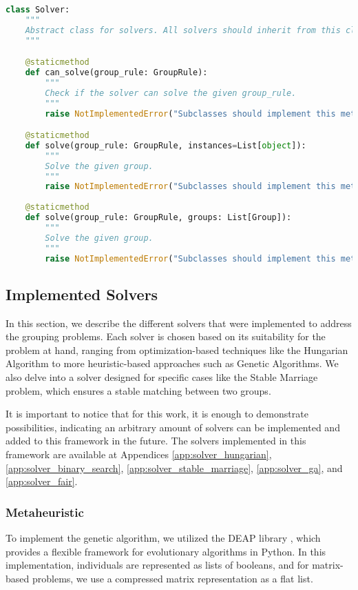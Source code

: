 \begin{lstlisting}[language=Python, caption={Solver Class.}, label={script:solver}]
class Solver:
    """
    Abstract class for solvers. All solvers should inherit from this class.
    """

    @staticmethod
    def can_solve(group_rule: GroupRule):
        """
        Check if the solver can solve the given group_rule.
        """
        raise NotImplementedError("Subclasses should implement this method.")

    @staticmethod
    def solve(group_rule: GroupRule, instances=List[object]):
        """
        Solve the given group.
        """
        raise NotImplementedError("Subclasses should implement this method.")
    
    @staticmethod
    def solve(group_rule: GroupRule, groups: List[Group]):
        """
        Solve the given group.
        """
        raise NotImplementedError("Subclasses should implement this method.")
    \end{lstlisting}

    \subsection{Implemented Solvers}
    \label{sec:implemented_solvers}
    In this section, we describe the different solvers that were implemented to address the grouping problems. Each solver is chosen based on its suitability for the problem at hand, ranging from optimization-based techniques like the Hungarian Algorithm to more heuristic-based approaches such as Genetic Algorithms. We also delve into a solver designed for specific cases like the Stable Marriage problem, which ensures a stable matching between two groups.

    It is important to notice that for this work, it is enough to demonstrate possibilities, indicating an arbitrary amount of solvers can be implemented and added to this framework in the future.
    The solvers implemented in this framework are available at Appendices \ref{app:solver_hungarian}, \ref{app:solver_binary_search}, \ref{app:solver_stable_marriage}, \ref{app:solver_ga}, and \ref{app:solver_fair}.

    \subsubsection{Metaheuristic}
        To implement the genetic algorithm, we utilized the DEAP library \cite{deap}, which provides a flexible framework for evolutionary algorithms in Python.
        In this implementation, individuals are represented as lists of booleans, and for matrix-based problems, we use a compressed matrix representation as a flat list.

